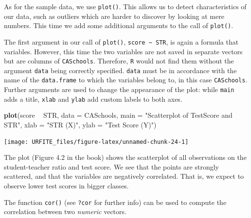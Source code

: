\documentclass[]{book}
\newenvironment{Shaded}{\begin{snugshade}}{\end{snugshade}}
\newcommand{\KeywordTok}[1]{\textcolor[rgb]{0.13,0.29,0.53}{\textbf{#1}}}
\newcommand{\DataTypeTok}[1]{\textcolor[rgb]{0.13,0.29,0.53}{#1}}
\newcommand{\StringTok}[1]{\textcolor[rgb]{0.31,0.60,0.02}{#1}}
\newcommand{\OperatorTok}[1]{\textcolor[rgb]{0.81,0.36,0.00}{\textbf{#1}}}
\newcommand{\NormalTok}[1]{#1}
\theoremstyle{definition}
\theoremstyle{definition}
\theoremstyle{definition}
\theoremstyle{remark}
\begin{document}
As for the sample data, we use \texttt{plot()}. This allows us to detect
characteristics of our data, such as outliers which are harder to
discover by looking at mere numbers. This time we add some additional
arguments to the call of \texttt{plot()}.

The first argument in our call of \texttt{plot()},
\texttt{score \textasciitilde{} STR}, is again a formula that variables.
However, this time the two variables are not saved in separate vectors
but are columns of \texttt{CASchools}. Therefore, \texttt{R} would not
find them without the argument \texttt{data} being correctly specified.
\texttt{data} must be in accordance with the name of the
\texttt{data.frame} to which the variables belong to, in this case
\texttt{CASchools}. Further arguments are used to change the appearance
of the plot: while \texttt{main} adds a title, \texttt{xlab} and
\texttt{ylab} add custom labels to both axes.

\begin{Shaded}
\begin{Highlighting}[]
\KeywordTok{plot}\NormalTok{(score }\OperatorTok{~}\StringTok{ }\NormalTok{STR, }
     \DataTypeTok{data =}\NormalTok{ CASchools,}
     \DataTypeTok{main =} \StringTok{"Scatterplot of TestScore and STR"}\NormalTok{, }
     \DataTypeTok{xlab =} \StringTok{"STR (X)"}\NormalTok{,}
     \DataTypeTok{ylab =} \StringTok{"Test Score (Y)"}\NormalTok{)}
\end{Highlighting}
\end{Shaded}

\begin{center}\texttt{[image: URFITE\_files/figure-latex/unnamed-chunk-24-1]} \end{center}

The plot (Figure 4.2 in the book) shows the scatterplot of all
observations on the student-teacher ratio and test score. We see that
the points are strongly scattered, and that the variables are negatively
correlated. That is, we expect to observe lower test scores in bigger
classes.

The function \texttt{cor()} (see \texttt{?cor} for further info) can be
used to compute the correlation between two \emph{numeric} vectors.

\begin{Shaded}
\end{Shaded}
\end{document}
